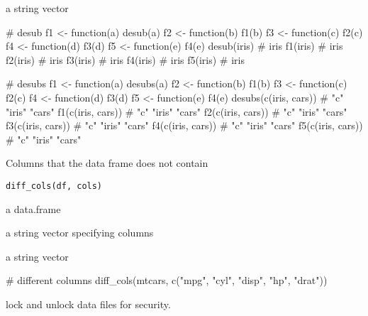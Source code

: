 \documentclass[letterpaper]{book}
\begin{document}
%
\begin{Value}
a string vector
\end{Value}
%
\begin{Examples}
\begin{ExampleCode}
# desub
f1 <- function(a) desub(a)
f2 <- function(b) f1(b)
f3 <- function(c) f2(c)
f4 <- function(d) f3(d)
f5 <- function(e) f4(e)
desub(iris) # iris
f1(iris) # iris
f2(iris) # iris
f3(iris) # iris
f4(iris) # iris
f5(iris) # iris

# desubs
f1 <- function(a) desubs(a)
f2 <- function(b) f1(b)
f3 <- function(c) f2(c)
f4 <- function(d) f3(d)
f5 <- function(e) f4(e)
desubs(c(iris, cars)) # "c" "iris" "cars"
f1(c(iris, cars)) # "c" "iris" "cars"
f2(c(iris, cars)) # "c" "iris" "cars"
f3(c(iris, cars)) # "c" "iris" "cars"
f4(c(iris, cars)) # "c" "iris" "cars"
f5(c(iris, cars)) # "c" "iris" "cars"

\end{ExampleCode}
\end{Examples}
%
\begin{Description}
Columns that the data frame does not contain
\end{Description}
%
\begin{Usage}
\begin{verbatim}
diff_cols(df, cols)
\end{verbatim}
\end{Usage}
%
\begin{Arguments}
\begin{ldescription}
\item[\code{df}] a data.frame

\item[\code{cols}] a string vector specifying columns
\end{ldescription}
\end{Arguments}
%
\begin{Value}
a string vector
\end{Value}
%
\begin{Examples}
\begin{ExampleCode}
# different columns
diff_cols(mtcars, c("mpg", "cyl", "disp", "hp", "drat"))

\end{ExampleCode}
\end{Examples}
%
\begin{Description}
lock and unlock data files for security.
\end{Description}
\end{document}

